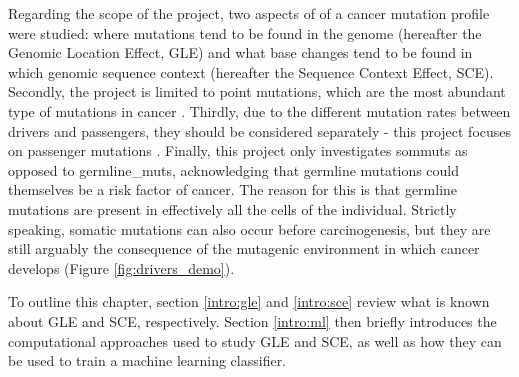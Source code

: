 

Regarding the scope of the project, two aspects of of a cancer mutation profile were studied: where mutations tend to be found in the genome (hereafter the Genomic Location Effect, GLE) and what \gls{base} changes tend to be found in which genomic sequence context (hereafter the Sequence Context Effect, SCE). Secondly, the project is limited to point mutations, which are the most abundant type of mutations in cancer \citep{Alexandrov2020}. Thirdly, due to the different mutation rates between drivers and passengers, they should be considered separately - this project focuses on passenger mutations \citep{McFarland2014Tug-of-warProcesses}. Finally, this project only investigates \glspl{sommut} as opposed to \glspl{germline_mut}, acknowledging that germline mutations could themselves be a risk factor of cancer. The reason for this is that germline mutations are present in effectively all the cells of the individual. Strictly speaking, somatic mutations can also occur before carcinogenesis, but they are still arguably the consequence of the mutagenic environment in which cancer develops (Figure \ref{fig:drivers_demo}). 

To outline this chapter, section \ref{intro:gle} and \ref{intro:sce} review what is known about GLE and SCE, respectively. Section \ref{intro:ml} then briefly introduces the computational approaches used to study GLE and SCE, as well as how they can be used to train a machine learning classifier. 

